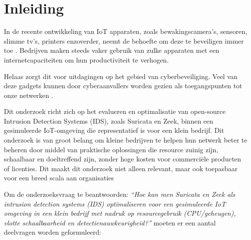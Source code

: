 


% 

\section{Inleiding}%
\label{sec:inleiding}

In de recente ontwikkeling van IoT apparaten, zoals bewakingscamera's, sensoren, slimme tv's, printers enzoverder, neemt de behoefte om deze te beveiligen immer toe \autocite{Matter2024}. Bedrijven maken steeds vaker gebruik van zulke apparaten met een internetcapaciteiten om hun productiviteit te verhogen. 

Helaas zorgt dit voor uitdagingen op het gebied van cyberbeveiliging. Veel van deze gadgets kunnen door cyberaanvallers worden gezien als toegangspunten tot onze netwerken \autocite{Hodes2024}. 

Dit onderzoek richt zich op het evalueren en optimalisatie van open-source Intrusion Detection Systems (IDS), zoals Suricata en Zeek, binnen een gesimuleerde IoT-omgeving die representatief is voor een klein bedrijf. Dit onderzoek is van groot belang om kleine bedrijven te helpen hun netwerk beter te beheren door middel van praktische oplossingen die resource zuinig zijn, schaalbaar en doeltreffend zijn, zonder hoge kosten voor commerciële producten of licenties. Dit maakt dit onderzoek niet alleen relevant, maar ook toepasbaar voor een breed scala aan organisaties

Om de onderzoeksvraag te beantwoorden: \emph{“Hoe kan men Suricata en Zeek als intrusion detection systems (IDS) optimaliseren voor een gesimuleerde IoT omgeving in een klein bedrijf met nadruk op resourcegebruik (CPU/geheugen), vlotte schaalbaarheid en detectienauwkeurigheid?”} moeten er een aantal deelvragen worden geformuleerd:


